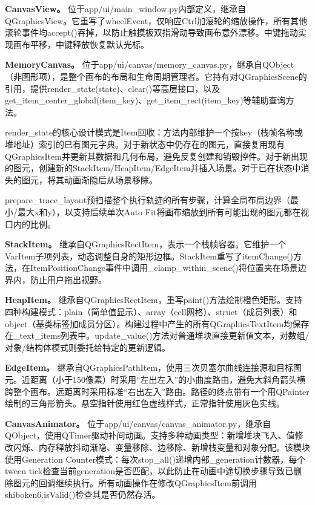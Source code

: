 \documentclass[12pt,a4paper]{ctexart}
\begin{document}
\textbf{CanvasView。} 位于app/ui/main\_window.py内部定义，继承自QGraphicsView。它重写了wheelEvent，仅响应Ctrl加滚轮的缩放操作，所有其他滚轮事件均accept()吞掉，以防止触摸板双指滑动导致画布意外漂移。中键拖动实现画布平移，中键释放恢复默认光标。

\textbf{MemoryCanvas。} 位于app/ui/canvas/memory\_canvas.py，继承自QObject（非图形项），是整个画布的布局和生命周期管理者。它持有对QGraphicsScene的引用，提供render\_state(state)、clear()等高层接口，以及get\_item\_center\_global(item\_key)、get\_item\_rect(item\_key)等辅助查询方法。

render\_state的核心设计模式是Item回收：方法内部维护一个按key（栈帧名称或堆地址）索引的已有图元字典。对于新状态中仍存在的图元，直接复用现有QGraphicsItem并更新其数据和几何布局，避免反复创建和销毁控件。对于新出现的图元，创建新的StackItem/HeapItem/EdgeItem并插入场景。对于已在状态中消失的图元，将其动画渐隐后从场景移除。

prepare\_trace\_layout预扫描整个执行轨迹的所有步骤，计算全局布局边界（最小/最大x和y），以支持后续单次Auto Fit将画布缩放到所有可能出现的图元都在视口内的比例。

\textbf{StackItem。} 继承自QGraphicsRectItem，表示一个栈帧容器。它维护一个VarItem子项列表，动态调整自身的矩形边框。StackItem重写了itemChange()方法，在ItemPositionChange事件中调用\_clamp\_within\_scene()将位置夹在场景边界内，防止用户拖出视野。

\textbf{HeapItem。} 继承自QGraphicsRectItem，重写paint()方法绘制橙色矩形。支持四种构建模式：plain（简单值显示）、array（cell网格）、struct（成员列表）和object（基类标签加成员分区）。构建过程中产生的所有QGraphicsTextItem均保存在\_text\_items列表中。update\_value()方法对普通堆块直接更新值文本，对数组/对象/结构体模式则委托给特定的更新逻辑。

\textbf{EdgeItem。} 继承自QGraphicsPathItem，使用三次贝塞尔曲线连接源和目标图元。近距离（小于150像素）时采用“左出左入”的小曲度路由，避免大斜角箭头横跨整个画布。远距离时采用标准“右出左入”路由。路径的终点带有一个用QPainter绘制的三角形箭头。悬空指针使用红色虚线样式，正常指针使用灰色实线。

\textbf{CanvasAnimator。} 位于app/ui/canvas/canvas\_animator.py，继承自QObject，使用QTimer驱动补间动画。支持多种动画类型：新增堆块飞入、值修改闪烁、内存释放抖动渐隐、变量移除、边移除、新增栈变量和对象分配。该模块使用Generation Counter模式：每次stop\_all()递增内部\_generation计数器，每个tween tick检查当前generation是否匹配，以此防止在动画中途切换步骤导致已删除图元的回调继续执行。所有动画操作在修改QGraphicsItem前调用shiboken6.isValid()检查其是否仍然存活。
\end{document}
